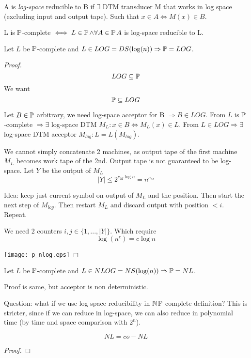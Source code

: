 \begin{definition}
	A is \emph{log-space} reducible to B if $\exists$ DTM transducer M that works in log space (excluding input and output tape).
	Such that $x \in A \iff M(x) \in B $.
\end{definition}

\begin{definition}
	L is $\operatorname{\mathbb{P}}$-complete $\iff L \in \operatorname{\mathbb{P}} \land \forall A \in \operatorname{\mathbb{P}} A$ is log-space reducible to L.
\end{definition}

\begin{theorem}
	Let $L$ be $\operatorname{\mathbb{P}}$-complete and $L \in LOG = DS(\log(n)) \Rightarrow \operatorname{\mathbb{P}} = LOG$.
\end{theorem}
\begin{proof}
	\[ LOG \subseteq \operatorname{\mathbb{P}} \]
	We want
	\[ \operatorname{\mathbb{P}} \subseteq LOG \]

	Let $B \in \operatorname{\mathbb{P}}$ arbitrary, we need log-space acceptor for B $\Rightarrow B \in LOG$.
	From $L$ is $\operatorname{\mathbb{P}}$-complete $\Rightarrow \exists$ log-space DTM $M_L: x \in B \iff M_L(x) \in L$.
	From $L \in LOG \Rightarrow \exists $ log-space DTM acceptor $M_{log}: L = L(M_{log}) $.

	We cannot simply concatenate 2 machines, as output tape of the first machine $M_L$ becomes work tape of the 2nd.
	Output tape is not guaranteed to be log-space.
	Let $Y$ be the output of $M_L$
	\[ |Y| \leq 2^{c_M \log n} = n^{c_M} \]

	Idea: keep just current symbol on output of $M_L$ and the position.
	Then start the next step of $M_{log}$.
	Then restart $M_L$ and discard output with position $ < i$.
	Repeat.

	We need 2 counters $i, j \in \{ 1, ..., |Y| \}$.
	Which require
	\[ \log(n^c) = c \log n \]

	\texttt{[image: p\_nlog.eps]}
\end{proof}

\begin{consequence}
	Let $L$ be $\operatorname{\mathbb{P}}$-complete and $L \in NLOG = NS(\log(n)) \Rightarrow \operatorname{\mathbb{P}} = NL$.

	Proof is same, but acceptor is non deterministic.
\end{consequence}

Question: what if we use log-space reducibility in $\operatorname{\operatorname{\mathbb{N}}\mathbb{P}}$-complete definition?
This is stricter, since if we can reduce in log-space, we can also reduce in polynomial time (by time and space comparison with $2^n$).

\begin{theorem}
	\[NL = co-NL \]
\end{theorem}
\begin{proof}
\end{proof}
